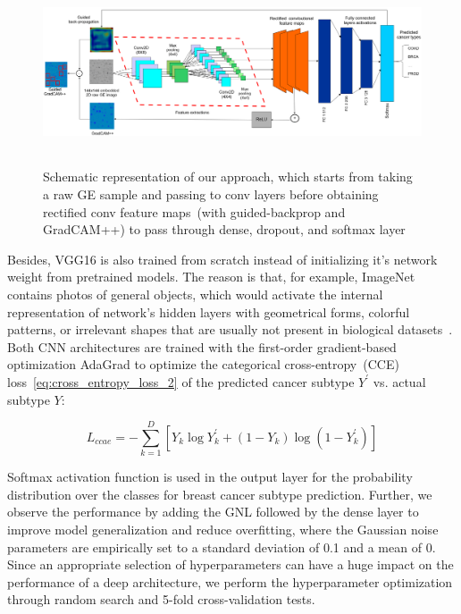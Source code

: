 \begin{figure}[h]
	\centering
	\includegraphics[width=\textwidth,height=55mm]{images/clstm.PNG}
    \caption{Schematic representation of our approach, which starts from taking a raw GE sample and passing to conv layers before obtaining rectified conv feature maps~(with guided-backprop and GradCAM++) to pass through dense, dropout, and softmax layer}	
	\label{fig:clstm}
\end{figure}

\hspace*{3.5mm} Besides, VGG16 is also trained from scratch instead of initializing it's network weight from pretrained models. The reason is that, for example, ImageNet contains photos of general objects, which would activate the internal representation of network's hidden layers with geometrical forms, colorful patterns, or irrelevant shapes that are usually not present in biological datasets~\cite{Karim2020DeepCOVIDExplainer}. Both CNN architectures are trained with the first-order gradient-based optimization AdaGrad to optimize the categorical cross-entropy~(CCE) loss~\cref{eq:cross_entropy_loss_2} of the predicted cancer subtype $Y^{\prime}$ vs. actual subtype $Y$: 

\vspace{-2mm}
\begin{equation} 
    L_{ccae}=-\sum_{k=1}^{D}\left[Y_{k} \log Y_{k}^{\prime}+\left(1-Y_{k}\right) \log \left(1-Y_{k}^{\prime}\right)\right]
    \label{eq:cross_entropy_loss_2}
\end{equation} 

\hspace*{3.5mm} Softmax activation function is used in the output layer for the probability distribution over the classes for breast cancer subtype prediction. Further, we observe the performance by adding the GNL followed by the dense layer to improve model generalization and reduce overfitting, where the Gaussian noise parameters are empirically set to a standard deviation of 0.1 and a mean of 0. Since an appropriate selection of hyperparameters can have a huge impact on the performance of a deep architecture, we perform the hyperparameter optimization through random search and 5-fold cross-validation tests. 

